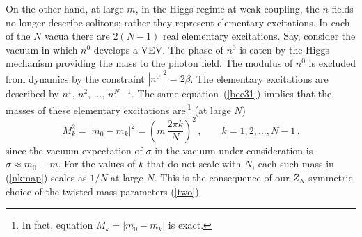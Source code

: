\documentclass[epsfig,12pt]{article}
\def\beq{\begin{equation}}
\def\eeq{\end{equation}}
\def\beq{\begin{equation}}
\def\eeq{\end{equation}}
\begin{document}
{On the other hand, at large $m$, in the Higgs regime at weak coupling,  the $n$ fields no longer describe solitons;
rather they represent elementary excitations. In each of the $N$ vacua
there are $2(N-1)$
real elementary excitations. Say, consider the vacuum in which $n^0$ develops a VEV.
The phase of $n^0$ is eaten by the Higgs mechanism providing the mass to the photon field.
The modulus of $n^0$ is excluded from dynamics by the constraint $\left|n^0\right|^2=2\beta$.
The elementary excitations are described by $n^1,\,n^2,\, ... ,\, n^{N-1}$.
The same equation~(\ref{bee31}) implies that the masses of these elementary excitations are\,\footnote{In fact, 
equation $M_k= \left| m_0 - m_k\right|$ is exact.}
(at large $N$)
\beq
M_k^2 = \left| m_0 - m_k\right|^2=
\left(m\, \frac{2\pi k}{N}
\right)^2
\,,\qquad k=1, 2, ..., N-1\,.
\label{nkmap}
\eeq
since the vacuum expectation of $\sigma$ in the vacuum under consideration is $\sigma\approx m_0\equiv m$.
For the values of $k$ that do not scale with $N$, each such mass in (\ref{nkmap}) scales as $1/N$ at large $N$.
This is the consequence of our $Z_N$-symmetric choice of the twisted mass parameters
(\ref{two}). 


}
\end{document}
